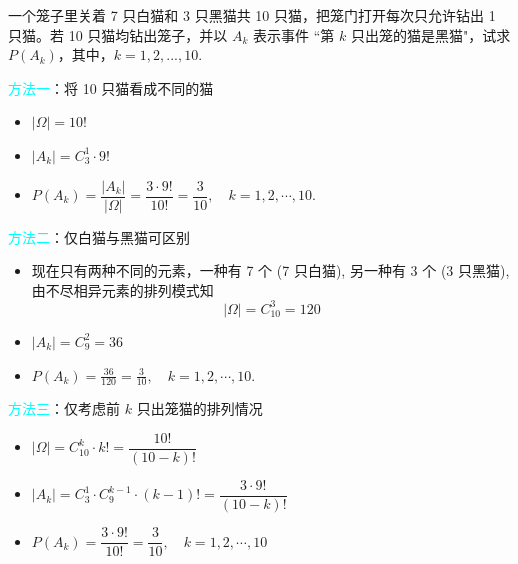 \documentclass[Prob-All.tex]{subfiles}
\begin{document}
	\begin{frame}%
		\begin{exam}
			\label{exam1.2}
			一个笼子里关着 7 只白猫和 3 只黑猫共 10 只猫，把笼门打开每次只允许钻出 1 只猫。若 10 只猫均钻出笼子，并以 $A_k$ 表示事件 ``第 $k$ 只出笼的猫是黑猫"，试求 $P (A_k)$，其中，$k=1,2,...,10$.
		\end{exam}


	\end{frame}
	\begin{frame}
		\textcolor{cyan}{方法一}：将 10 只猫看成不同的猫
		\begin{itemize}[<+-|alert@+>]
			\item  $|\Omega|=10!$
			\item  $\left|A_{k}\right|=C_3^1 \cdot 9!$
			\item $
			P\left(A_{k}\right)=\dfrac{\left|A_{k}\right|}{|\Omega|}=\dfrac{3 \cdot 9 !}{10 !}=\dfrac{3}{10}, \quad k=1,2, \cdots, 10 .	$
		\end{itemize}



	\end{frame}


	\begin{frame}%
		\textcolor{cyan}{方法二}：仅白猫与黑猫可区别
		\begin{itemize}[<+-|alert@+>]
			\item 现在只有两种不同的元素，一种有 7 个 (7 只白猫), 另一种有 3 个 (3 只黑猫), 由不尽相异元素的排列模式知
			$$|\Omega|=C_{10}^3=120$$
			\item  $\left|A_{k}\right|=C_9^2=36$

			\item $
			P\left(A_{k}\right)=\frac{36}{120}=\frac{3}{10}, \quad k=1,2, \cdots, 10 .
			$
		\end{itemize}

	\end{frame}
	\begin{frame}%
		\textcolor{cyan}{方法三}：仅考虑前 $k$ 只出笼猫的排列情况 %
		\begin{itemize}[<+-|alert@+>]
			\item $|\Omega|=C_{10}^k\cdot k!=\dfrac{10!}{(10-k) !}$
			\item $\left|A_{k}\right|=C_{3}^1\cdot C_{9}^{k-1}\cdot (k-1)!=\dfrac{3 \cdot 9!}{(10-k) !}$
			\item  $
			P\left(A_{k}\right)=\dfrac{3 \cdot 9 !}{10 !}=\dfrac{3}{10}, \quad k=1,2, \cdots, 10
			$
		\end{itemize}

	\end{frame}
\end{document}
